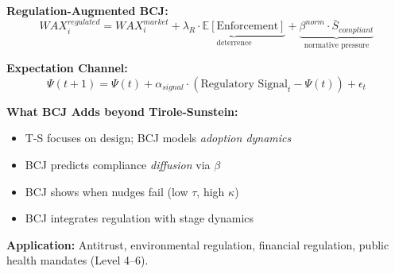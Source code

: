 \begin{tcolorbox}[colback=green!5!white, colframe=green!75!black,
    title=Theorem BCJ-T44: Behavioral Regulation as Special Case]
\textbf{Regulation-Augmented BCJ:}
\begin{equation}
WAX_i^{regulated} = WAX_i^{market} + \underbrace{\lambda_R \cdot \mathbb{E}[\text{Enforcement}]}_{\text{deterrence}} + \underbrace{\beta^{norm} \cdot \bar{S}_{compliant}}_{\text{normative pressure}}
\end{equation}

\textbf{Expectation Channel:}
\begin{equation}
\Psi(t+1) = \Psi(t) + \alpha_{signal} \cdot (\text{Regulatory Signal}_t - \Psi(t)) + \epsilon_t
\end{equation}

\textbf{What BCJ Adds beyond Tirole-Sunstein:}
\begin{itemize}[nosep]
\item T-S focuses on design; BCJ models \textit{adoption dynamics}
\item BCJ predicts compliance \textit{diffusion} via $\beta$
\item BCJ shows when nudges fail (low $\tau$, high $\kappa$)
\item BCJ integrates regulation with stage dynamics
\end{itemize}

\textbf{Application:} Antitrust, environmental regulation, financial regulation, public health mandates (Level 4--6).
\end{tcolorbox}

